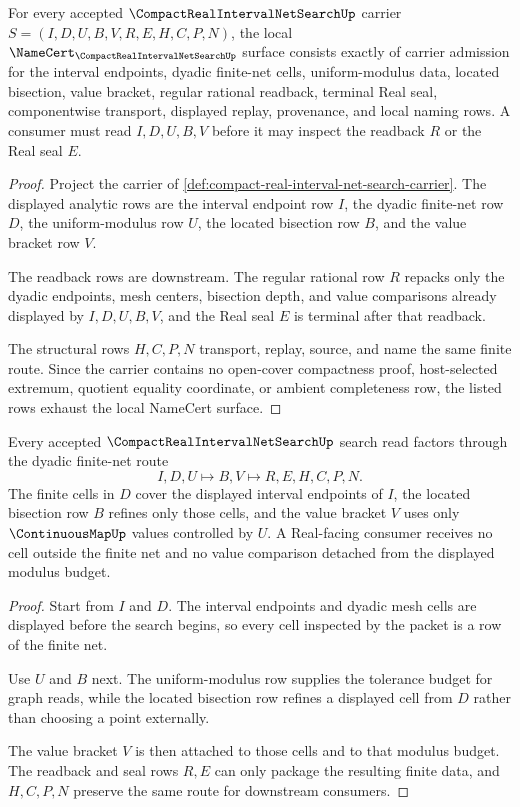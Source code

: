 \begin{theorem}
\label{thm:compact-real-interval-net-search-obligations}
For every accepted $\CompactRealIntervalNetSearchUp$ carrier $S=(I,D,U,B,V,R,E,H,C,P,N)$, the local $\NameCert_{\CompactRealIntervalNetSearchUp}$ surface consists exactly of carrier admission for the interval endpoints, dyadic finite-net cells, uniform-modulus data, located bisection, value bracket, regular rational readback, terminal Real seal, componentwise transport, displayed replay, provenance, and local naming rows. A consumer must read $I,D,U,B,V$ before it may inspect the readback $R$ or the Real seal $E$.
\end{theorem}
\begin{proof}
Project the carrier of \autoref{def:compact-real-interval-net-search-carrier}. The displayed analytic rows are the interval endpoint row $I$, the dyadic finite-net row $D$, the uniform-modulus row $U$, the located bisection row $B$, and the value bracket row $V$.

The readback rows are downstream. The regular rational row $R$ repacks only the dyadic endpoints, mesh centers, bisection depth, and value comparisons already displayed by $I,D,U,B,V$, and the Real seal $E$ is terminal after that readback.

The structural rows $H,C,P,N$ transport, replay, source, and name the same finite route. Since the carrier contains no open-cover compactness proof, host-selected extremum, quotient equality coordinate, or ambient completeness row, the listed rows exhaust the local NameCert surface.
\end{proof}

\begin{theorem}
\label{thm:compact-real-interval-net-search-dyadic-net-soundness}
Every accepted $\CompactRealIntervalNetSearchUp$ search read factors through the dyadic finite-net route
$$
I,D,U \longmapsto B,V \longmapsto R,E,H,C,P,N .
$$
The finite cells in $D$ cover the displayed interval endpoints of $I$, the located bisection row $B$ refines only those cells, and the value bracket $V$ uses only $\ContinuousMapUp$ values controlled by $U$. A Real-facing consumer receives no cell outside the finite net and no value comparison detached from the displayed modulus budget.
\end{theorem}
\begin{proof}
Start from $I$ and $D$. The interval endpoints and dyadic mesh cells are displayed before the search begins, so every cell inspected by the packet is a row of the finite net.

Use $U$ and $B$ next. The uniform-modulus row supplies the tolerance budget for graph reads, while the located bisection row refines a displayed cell from $D$ rather than choosing a point externally.

The value bracket $V$ is then attached to those cells and to that modulus budget. The readback and seal rows $R,E$ can only package the resulting finite data, and $H,C,P,N$ preserve the same route for downstream consumers.
\end{proof}


